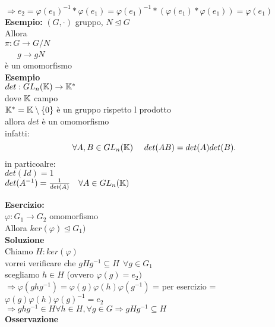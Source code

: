 \documentclass[12px]{article}
\begin{document}
   $ \Rightarrow e_2 = \varphi(e_1)^{-1}* \varphi(e_1) = \varphi(e_1)^{-1}*( \varphi(e_1)* \varphi(e_1)) = \varphi(e_1)$ \\
   \textbf{Esempio:}
   $(G,\cdot)$ gruppo, $N\trianglelefteq G$\\
   Allora\\
   $\pi:G \rightarrow G/N$\\
   \text{} \ \ \ $g \rightarrow gN$\\
   è un omomorfismo\\
   \textbf{Esempio}\\
   $det: GL_n (\K) \rightarrow \K^*$ \\
   dove $\K$ campo\\
    $\K^* = \K \setminus \lbrace 0 \rbrace$ è un gruppo rispetto l prodotto\\
    allora  $det$ è un omomorfismo\\
    infatti:
     \[
    \forall A,B\in GL_n(\K) \ \ \ \ det(AB) = det(A)det(B)
    .\] 
    in particoalre:\\
    $det(Id) = 1$\\
    $det(A^{-1}) = \frac 1 {det(A)} \ \ \ \forall A\in GL_n(\K)$
     \begin{defi}
    	$ \varphi: G_1 \rightarrow G_2$ omomorfismo\\
	il nucleo di $ \varphi$ è $ker( \varphi) := \lbrace g\in G_1| \varphi(g) = e\rbrace$\\
	L'immagine di $\phi$ è \\
	$Im ( \varphi) = \lbrace{h\in H_2 | \exists g\in G_1: \varphi (g) = h \rbrace$
    \end{defi}
    \textbf{Esercizio:}\\
    $\varphi: G_1 \rightarrow G_2 $ omomorfismo\\
    Allora $ker( \varphi)\trianglelefteq G_1)$\\
    \textbf{Soluzione}\\
    Chiamo $H:ker ( \varphi )$\\
    vorrei verificare che $g Hg^{-1}\subseteq H \ \ \forall g\in G_1$\\
    scegliamo $h\in H$ (ovvero $ \varphi(g) = e_2)$\\
    $ \Rightarrow  \varphi(ghg^{-1}) = \varphi(g) \varphi(h) \varphi(g^{-1})$ = per esercizio = $ \varphi(g) \varphi(h) \varphi(g)^{-1} = e_2$\\
    $ \Rightarrow ghg^{-1}\in H\forall h\in H, \forall g\in G \Rightarrow gHg^{-1}\subseteq H$\\
    \textbf{Osservazione}\\
\end{document}
